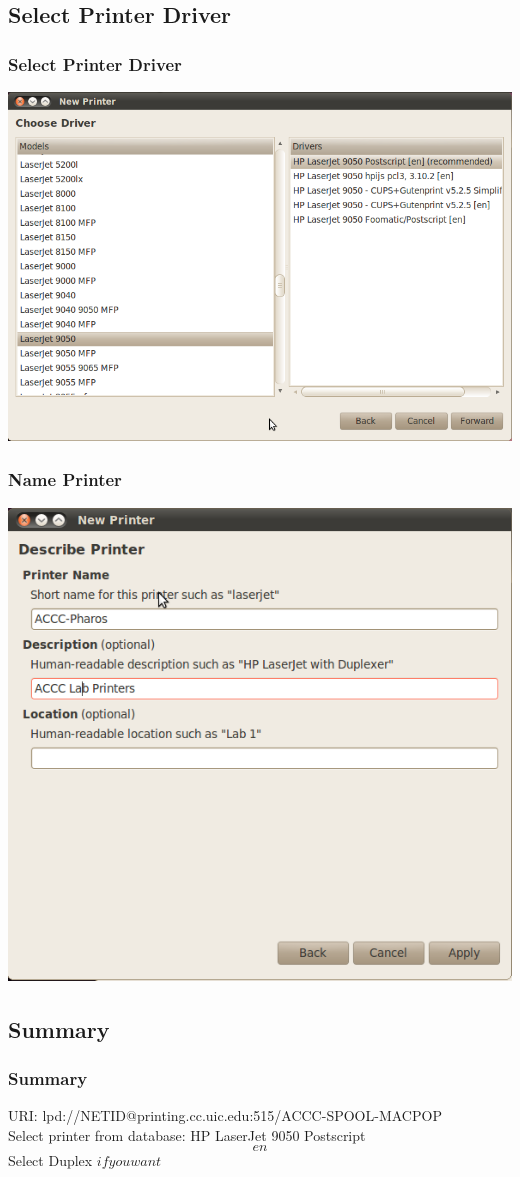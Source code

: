 \documentclass[hyperref={pdfpagelabels=false}]{beamer}
\begin{document}
\subsection{Select Printer Driver}
\frame
{
    \frametitle{Select Printer Driver}
     \includegraphics[totalheight=0.8\textheight]{PrinterDriver.png}
}
\frame
{
    \frametitle{Name Printer}
     \includegraphics[totalheight=0.8\textheight]{PrinterName.png}

}
\subsection{Summary}
\frame
{
    \frametitle{Summary}
URI: lpd://NETID@printing.cc.uic.edu:515/ACCC-SPOOL-MACPOP\\
Select printer from database: HP LaserJet 9050 Postscript \[en\]
Select Duplex \(if you want\)
}
\end{document}

